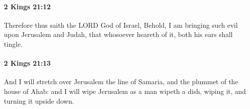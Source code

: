 		\paragraph{2 Kings 21:12} %
			\label{2KINGS-21-12}

			Therefore thus saith the LORD God of Israel, Behold, I am bringing such evil upon Jerusalem and Judah, that whosoever heareth of it, both his ears shall tingle.


		\paragraph{2 Kings 21:13} %
			\label{2KINGS-21-13}

			And I will stretch over Jerusalem the line of Samaria, and the plummet of the house of Ahab: and I will wipe Jerusalem as a man wipeth a dish, wiping it, and turning it upside down.


